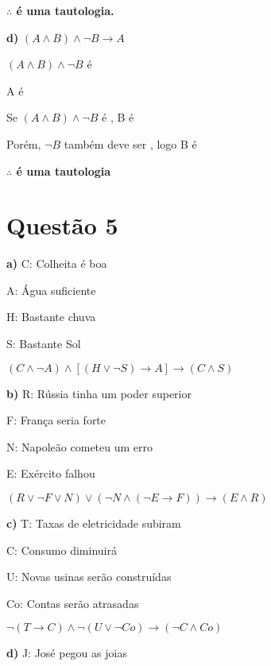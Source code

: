 \documentclass{article}
\begin{document}
\medskip
\noindent
\dotfill
\medskip

\noindent
\textbf{$\therefore$ é uma tautologia.}

\bigskip
\noindent
\textbf{d)} $(A \wedge B) \wedge \neg B \rightarrow A$

\medskip
\noindent
$(A \wedge B) \wedge \neg B$ é \vv

\noindent
A é \ff

\medskip
\noindent
\dotfill
\medskip

\noindent
Se $(A \wedge B) \wedge \neg B$ é \vv, B é \vv

\noindent
Porém, $\neg B$ também deve ser \vv, logo B é \ff

\noindent
\textbf{$\therefore$ é uma tautologia}

\section*{Questão 5}
\bigskip
\noindent
\textbf{a)}
C: Colheita é boa

A: Água suficiente

H: Bastante chuva

S: Bastante Sol

\medskip
$(C \wedge \neg A) \wedge [(H \vee \neg S) \rightarrow A] \rightarrow (C \wedge S)$

\bigskip
\noindent
\textbf{b)}
R: Rússia tinha um poder superior

F: França seria forte

N: Napoleão cometeu um erro

E: Exército falhou

\medskip
$(R \vee \neg F \vee N) \vee (\neg N \wedge (\neg E \rightarrow F)) \rightarrow (E \wedge R)$

\bigskip
\noindent
\textbf{c)}
T: Taxas de eletricidade subiram

C: Consumo diminuirá

U: Novas usinas serão construídas

Co: Contas serão atrasadas

\medskip
$\neg (T \rightarrow C) \wedge \neg (U \vee \neg Co) \rightarrow (\neg C \wedge Co)$

\bigskip
\noindent
\textbf{d)}
J: José pegou as joias
\end{document}

